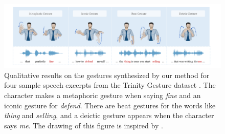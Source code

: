 \begin{figure}[t]
    \centering
    \includegraphics[width=\textwidth]{figures/fig6.pdf}
    \caption{Qualitative results on the gestures synthesized by our method for four sample speech excerpts from the Trinity Gesture dataset \cite{ferstl2018investigating}. The character makes a metaphoric gesture when saying \emph{fine} and an iconic gesture for \emph{defend}. There are beat gestures for the words like \emph{thing} and \emph{selling}, and a deictic gesture appears when the character says \emph{me}. The drawing of this figure is inspired by \cite{yoon2020speech}.}
    \Description{}
    \label{fig:fig6}
\end{figure}

